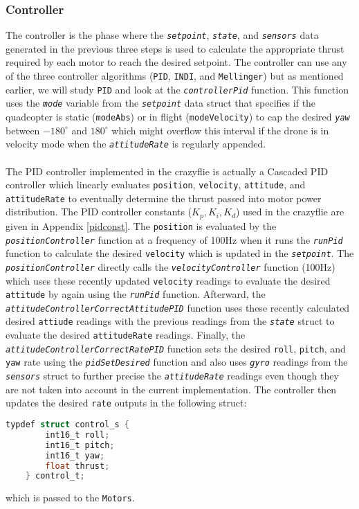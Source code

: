 \documentclass[10pt, a4paper]{article}
\newcommand{\textFunc}[1]{\texttt{\textit{#1}}}
\newcommand{\textDef}[1]{\texttt{#1}}
\newcommand{\app}[1]{Appendix \ref{#1}}
\begin{document}
    \subsubsection{Controller}
    \label{controller}
        The controller is the phase where the \textFunc{setpoint}, \textFunc{state}, and \textFunc{sensors} data generated in the previous three steps is used to calculate the appropriate thrust required by each motor to reach the desired setpoint. The controller can use any of the three controller algorithms (\textDef{PID}, \textDef{INDI}, and \textDef{Mellinger}) but as mentioned earlier, we will study \textDef{PID} and look at the \textFunc{controllerPid} function. This function uses the \textFunc{mode} variable from the \textFunc{setpoint} data struct that specifies if the quadcopter is static (\textDef{modeAbs}) or in flight (\textDef{modeVelocity}) to cap the desired \textFunc{yaw} between $-180^{\circ}$ and $180^{\circ}$ which might overflow this interval if the drone is in velocity mode when the \textFunc{attitudeRate} is regularly appended.
        \\\\
        The PID controller implemented in the crazyflie is actually a Cascaded PID controller which linearly evaluates \textDef{position}, \textDef{velocity}, \textDef{attitude}, and \textDef{attitudeRate} to eventually determine the thrust passed into motor power distribution. The PID controller constants ($K_p, K_i, K_d$) used in the crazyflie are given in \app{pidconst}. The \textDef{position} is evaluated by the \textFunc{positionController} function at a frequency of 100Hz when it runs the \textFunc{runPid} function to calculate the desired \textDef{velocity} which is updated in the \textFunc{setpoint}. The \textFunc{positionController} directly calls the \textFunc{velocityController} function (100Hz) which uses these recently updated \textDef{velocity} readings to evaluate the desired \textDef{attitude} by again using the \textFunc{runPid} function. Afterward, the \textFunc{attitudeControllerCorrectAttitudePID} function uses these recently calculated desired \textDef{attiude} readings with the previous readings from the \textFunc{state} struct to evaluate the desired \textDef{attitudeRate} readings. Finally, the \textFunc{attitudeControllerCorrectRatePID} function sets the desired \textDef{roll}, \textDef{pitch}, and \textDef{yaw} rate using the \textFunc{pidSetDesired} function and also uses \textFunc{gyro} readings from the \textFunc{sensors} struct to further precise the \textFunc{attitudeRate} readings even though they are not taken into account in the current implementation. The controller then updates the desired \textDef{rate} outputs in the following struct:
        \begin{lstlisting}[language=C]
    typdef struct control_s {
        int16_t roll;
        int16_t pitch;
        int16_t yaw;
        float thrust;
    } control_t;
        \end{lstlisting}
        which is passed to the \textDef{Motors}.
    
\end{document}
